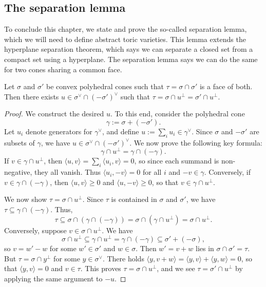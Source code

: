 \subsection{The separation lemma}
To conclude this chapter, we state and prove the so-called separation lemma, which we will need to define abstract toric varieties.
This lemma extends the hyperplane separation theorem, which says we can separate a closed set from a compact set using a hyperplane.
The separation lemma says we can do the same for two cones sharing a common face.

\begin{lemma}
Let $\sigma$ and $\sigma'$ be convex polyhedral cones such that $\tau = \sigma \cap \sigma'$ is a face of both.
Then there exists $u \in \sigma^\vee \cap (-\sigma')^\vee$ such that $\tau = \sigma \cap u^\perp = \sigma' \cap u^\perp$.
\end{lemma}
\begin{proof}
We construct the desired $u$.
To this end, consider the polyhedral cone 
$$\gamma := \sigma + (-\sigma').$$
Let $u_i$ denote generators for $\gamma^\vee$, and define $u := \sum_i u_i \in \gamma^\vee$.
Since $\sigma$ and $-\sigma'$ are subsets of $\gamma$, we have $u \in \sigma^\vee \cap (-\sigma')^\vee$.
We now prove the following key formula:
$$\gamma \cap u^\perp = \gamma \cap (-\gamma).$$
If $v \in \gamma \cap u^\perp$, then $\langle u, v \rangle = \sum_i \langle u_i, v\rangle = 0$, so since each summand is non-negative, they all vanish.
Thus $\langle u_i, -v \rangle = 0$ for all $i$ and $-v \in \gamma$.
Conversely, if $v \in \gamma \cap (-\gamma)$, then $\langle u, v \rangle \ge 0$ and $\langle u, -v \rangle \ge 0$, so that $v \in \gamma \cap u^\perp$.

We now show $\tau = \sigma \cap u^\perp$.
Since $\tau$ is contained in $\sigma$ and $\sigma'$, we have $\tau \subseteq \gamma \cap (-\gamma)$.
Thus,
$$\tau \subseteq \sigma \cap (\gamma \cap (-\gamma)) = \sigma \cap (\gamma \cap u^\perp) = \sigma \cap u^\perp.$$
Conversely, suppose $v \in \sigma \cap u^\perp$.
We have
$$\sigma \cap u^\perp \subseteq \gamma \cap u^\perp = \gamma \cap (-\gamma) \subseteq \sigma' + (-\sigma),$$
so $v = w' - w$ for some $w' \in \sigma'$ and $w \in \sigma$.
Then $w' = v + w$ lies in $\sigma \cap \sigma' = \tau$.
But $\tau = \sigma \cap y^\perp$ for some $y \in \sigma^\vee$.
There holds $\langle y, v + w \rangle = \langle y, v \rangle + \langle y, w \rangle = 0$, so that $\langle y, v \rangle = 0$ and $v \in \tau$.
This proves $\tau = \sigma \cap u^\perp$, and we see $\tau = \sigma' \cap u^\perp$ by applying the same argument to $-u$.
\end{proof}